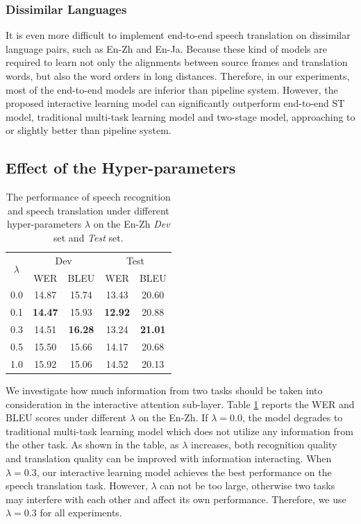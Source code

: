 \documentclass[letterpaper]{article} %
\begin{document}
\subsubsection{Dissimilar Languages}
It is even more difficult to implement end-to-end speech translation on dissimilar language pairs, such as En-Zh and En-Ja. Because these kind of models are required to learn not only the alignments between source frames and translation words, but also the word orders in long distances. Therefore, in our experiments, most of the end-to-end models are inferior than pipeline system. However, the proposed interactive learning model can significantly outperform end-to-end ST model, traditional multi-task learning model and two-stage model, approaching to or slightly better than  pipeline system.

\subsection{Effect of the Hyper-parameters}
\label{sec:lambda}
\begin{table}[t]
	\centering
	\begin{tabular}{@{}c|cc|cc@{}}
		\hline
		\multirow{2}{*}{$\lambda$} & \multicolumn{2}{c|}{Dev} & \multicolumn{2}{c}{Test} \\
		\multicolumn{1}{c|}{}    & WER      & BLEU     & WER      & BLEU     \\
		\cline{1-5}
		0.0                                       & 14.87       & 15.74       & 13.43       & 20.60       \\
		0.1                                        & \textbf{14.47 }      & 15.93       & \textbf{12.92  }     & 20.88       \\
		0.3                                       &  14.51     &    \textbf{16.28 }     & 13.24       &      \textbf{21.01}  \\
		0.5                                       &  15.50        & 15.66       & 14.17       & 20.68        \\
		1.0                                       &   15.92         &  15.06          &     14.52        &    20.13        \\
		\hline
	\end{tabular}
	\caption{The performance of speech recognition and speech translation under different hyper-parameters $\lambda$ on the En-Zh \textit{Dev} set and \textit{Test} set.}
	\label{tbl:hyper-parameter}
\end{table}
We investigate how much information from two tasks should be taken into consideration in the interactive attention sub-layer. Table \ref{tbl:hyper-parameter} reports the WER and BLEU scores under different $\lambda$ on the En-Zh. If $\lambda=0.0$, the model degrades to traditional multi-task learning model which does not utilize any information from the other task. As shown in the table, as $\lambda$ increases, both recognition quality and translation quality can be improved with information interacting. When $\lambda=0.3$, our interactive learning model achieves the best performance on the speech translation task.  However, $\lambda$ can not be too large, otherwise two tasks may  interfere with each other and affect its own performance. Therefore, we use $\lambda=0.3$ for all experiments.
\end{document}
